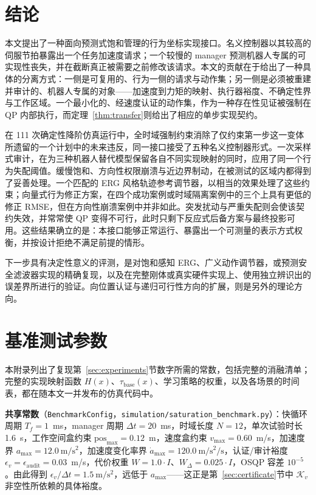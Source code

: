 \documentclass[journal]{IEEEtran}
\begin{document}
\section{结论}

本文提出了一种面向预测式饱和管理的行为坐标实现接口。名义控制器以其较高的伺服节拍暴露出一个任务加速度请求；一个较慢的 manager 预测机器人专属的可实现性丧失，并在截断真正被需要之前修改该请求。本文的贡献在于给出了一种具体的分离方式：一侧是可复用的、行为一侧的请求与动作集；另一侧是必须被重建并审计的、机器人专属的对象——加速度到力矩的映射、执行器裕度、不确定性界与工作区域。一个最小化的、经速度认证的动作集，作为一种存在性见证被强制在 QP 内部执行，而定理~\ref{thm:transfer}则给出了相应的单步实现契约。

在 111 次确定性降阶仿真运行中，全时域强制约束消除了仅约束第一步这一变体所遗留的一个计划中的未来违反，同一接口接受了五种名义控制器形式。一次采样式审计，在为三种机器人替代模型保留各自不同实现映射的同时，应用了同一个行为失配阈值。缓慢饱和、方向性权限崩溃与近边界制动，在被测试的区域内都得到了妥善处理。一个匹配的 ERG 风格轨迹参考调节器，以相当的效果处理了这些约束；向量式行为修正方案，在四个成功案例或时域隔离案例中的三个上具有更低的修正 RMSE，但在方向性崩溃案例中并非如此。突发扰动与严重失配则会使该契约失效，并常常使 QP 变得不可行，此时只剩下反应式后备方案与最终投影可用。这些结果确立的是：本接口能够正常运行、暴露出一个可测量的表示方式权衡，并按设计拒绝不满足前提的情形。

下一步具有决定性意义的评测，是对饱和感知 ERG、广义动作调节器，或预测安全滤波器实现的精确复现，以及在完整刚体或真实硬件实现上、使用独立辨识出的误差界所进行的验证。向位置认证与递归可行性方向的扩展，则是另外的理论方向。

\appendices
\section{基准测试参数}
\label{app:params}

本附录列出了复现第~\ref{sec:experiments}节数字所需的常数，包括完整的消融清单；完整的实现映射函数 $H(x)$、$\tau_{\mathrm{base}}(x)$、学习策略的权重，以及各场景的时间表，都在随本文一并发布的仿真代码中。

\textbf{共享常数}（\texttt{BenchmarkConfig}，\texttt{simulation/saturation\_benchmark.py}）：快循环周期 $T_f=1$~ms，manager 周期 $\Delta t=20$~ms，时域长度 $N=12$，单次试验时长 1.6~s，工作空间盒约束 $\mathrm{pos}_{\max}=0.12$~m，速度盒约束 $v_{\max}=0.60$~m/s，加速度界 $a_{\max}=12.0~\mathrm{m/s^2}$，加速度变化率界 $\dot a_{\max}=120.0~\mathrm{m/s^2/s}$，认证/审计裕度 $\epsilon_v=\epsilon_{\mathrm{audit}}=0.03$~m/s，代价权重 $W=1.0\cdot I$、$W_\Delta=0.025\cdot I$，OSQP 容差 $10^{-5}$。由此得到 $\epsilon_v/\Delta t=1.5~\mathrm{m/s^2}$，远低于 $a_{\max}$——这正是第~\ref{sec:certificate}节中 $\mathcal K_v$ 非空性所依赖的具体裕度。
\end{document}
